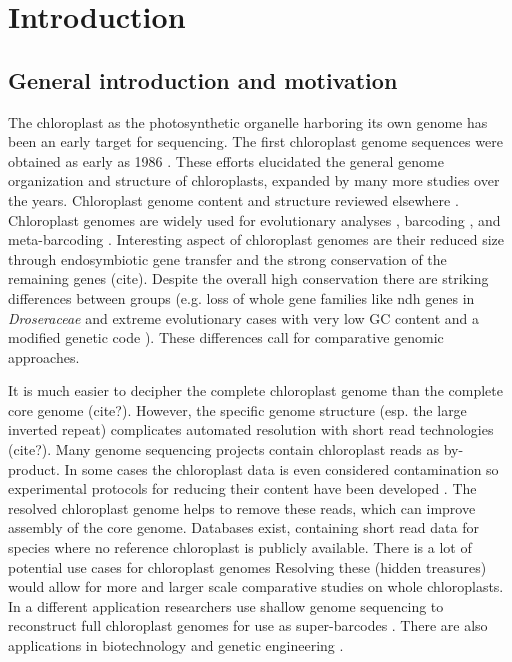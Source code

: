 \documentclass{bmcart}
\begin{document}

\section*{Introduction}
\subsection*{General introduction and motivation}
The chloroplast as the photosynthetic organelle harboring its own genome has been an early target for sequencing.
The first chloroplast genome sequences were obtained as early as 1986 \cite{ohyama_chloroplast_1986,shinozaki_complete_1986}.
These efforts elucidated the general genome organization and structure of chloroplasts, expanded by many more studies over the years.
Chloroplast genome content and structure reviewed elsewhere \cite{wicke_evolution_2011,green_chloroplast_2011}.
Chloroplast genomes are widely used for evolutionary analyses \cite{martin_plastid_2010,xiao-ming_inferring_2017}, barcoding \cite{kress_use_2005,hollingsworth_dna_2009,de_vere_dna_2015}, and meta-barcoding \cite{bell_review_2016,deiner_environmental_2017}.
Interesting aspect of chloroplast genomes are their reduced size through endosymbiotic gene transfer \cite{martin_evolutionary_2002,timmis_endosymbiotic_2004} and the strong conservation of the remaining genes (cite).
Despite the overall high conservation there are striking differences between groups (e.g. loss of whole gene families like ndh genes in \textit{Droseraceae} \cite{nevill_plastome-wide_2019} and extreme evolutionary cases with very low GC content and a modified genetic code \cite{su_novel_2019}).
These differences call for comparative genomic approaches.

It is much easier to decipher the complete chloroplast genome than the complete core genome (cite?).
However, the specific genome structure (esp. the large inverted repeat) complicates automated resolution with short read technologies (cite?).
Many genome sequencing projects contain chloroplast reads as by-product.
In some cases the chloroplast data is even considered contamination so experimental protocols for reducing their content have been developed \cite{lutz_isolation_2011}.
The resolved chloroplast genome helps to remove these reads, which can improve assembly of the core genome.
Databases exist, containing short read data for species where no reference chloroplast is publicly available.
There is a lot of potential use cases for chloroplast genomes \cite{tonti-filippini_what_2017}
Resolving these (hidden treasures) would allow for more and larger scale comparative studies on whole chloroplasts.
In a different application researchers use shallow genome sequencing to reconstruct full chloroplast genomes for use as super-barcodes \cite{coissac_barcodes_2016}.
There are also applications in biotechnology and genetic engineering \cite{daniell_chloroplast_2016}.
\end{document}
